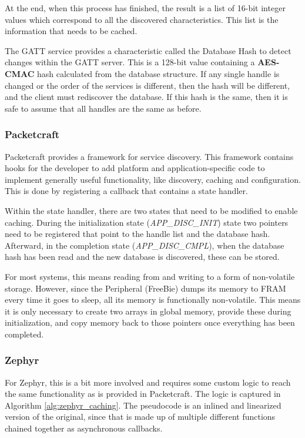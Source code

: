 At the end, when this process has finished, the result is a list of 16-bit integer values which correspond to all the discovered characteristics. This list is the information that needs to be cached. 

The GATT service provides a characteristic called the Database Hash to detect changes within the GATT server. This is a 128-bit value containing a \textbf{AES-CMAC} hash calculated from the database structure. If any single handle is changed or the order of the services is different, then the hash will be different, and the client must rediscover the database. If this hash is the same, then it is safe to assume that all handles are the same as before.

\subsubsection{Packetcraft}
Packetcraft provides a framework for service discovery. This framework contains hooks for the developer to add platform and application-specific code to implement generally useful functionality, like discovery, caching and configuration. This is done by registering a callback that contains a state handler. 

Within the state handler, there are two states that need to be modified to enable caching. During the initialization state (\textit{APP\_DISC\_INIT}) state two pointers need to be registered that point to the handle list and the database hash. Afterward, in the completion state (\textit{APP\_DISC\_CMPL}), when the database hash has been read and the new database is discovered, these can be stored.

For most systems, this means reading from and writing to a form of non-volatile storage. However, since the Peripheral (FreeBie) dumps its memory to FRAM every time it goes to sleep, all its memory is functionally non-volatile. This means it is only necessary to create two arrays in global memory, provide these during initialization, and copy memory back to those pointers once everything has been completed.

\subsubsection{Zephyr}
For Zephyr, this is a bit more involved and requires some custom logic to reach the same functionality as is provided in Packetcraft. The logic is captured in Algorithm \ref{alg:zephyr_caching}. The pseudocode is an inlined and linearized version of the original, since that is made up of multiple different functions chained together as asynchronous callbacks.

